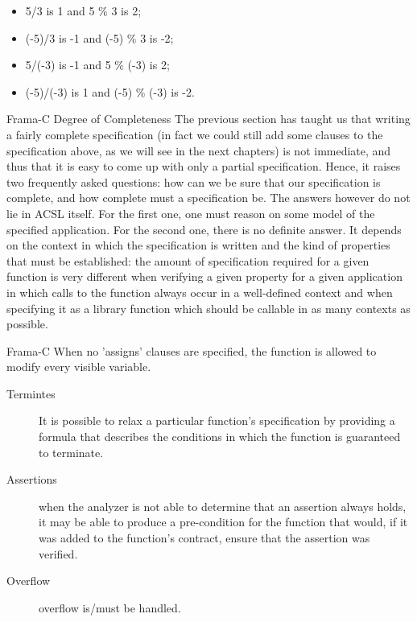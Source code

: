 \documentclass[10pt]{article} %
\begin{document}
\begin{itemize}
\item 5\slash 3 is 1 and 5 \% 3 is 2;
\item (-5)\slash 3 is -1 and (-5) \% 3 is -2;
\item 5\slash (-3) is -1 and 5 \% (-3) is 2;
\item (-5)\slash (-3) is 1 and (-5) \% (-3) is -2.
\end{itemize}

Frama-C Degree of Completeness The previous section has taught us that writing a fairly complete specification (in fact we could still add some clauses to the specification above, as we will see in the next chapters) is not immediate, and thus that it is easy to come up with only a partial specification. Hence, it raises two frequently asked questions: how can we be sure that our specification is complete, and how complete must a specification be. The answers however do not lie in ACSL itself. For the first one, one must reason on some model of the specified application. For the second one, there is no definite answer. It depends on the context in which the specification is written and the kind of properties that must be established: the amount of specification required for a given function is very different when verifying a given property for a given application in which calls to the function always occur in a well-defined context and when specifying it as a library function which should be callable in as many contexts as possible.

Frama-C When no 'assigns' clauses are specified, the function is allowed to modify every visible variable.
\begin{description}
\item[Termintes]It is possible to relax a particular function’s specification by providing a formula that describes the conditions in which the function is guaranteed to terminate. 
\item[Assertions]when the analyzer is not able to determine that an assertion always holds, it may be able to produce a pre-condition for the function that would, if it was added to the function’s contract, ensure that the assertion was verified. 
\item[Overflow] overflow is\slash must be handled.
\end{description}

\end{document}
